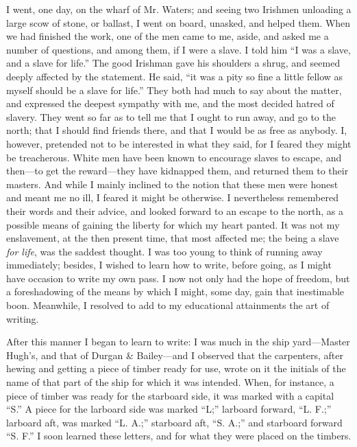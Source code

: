 I went, one day, on the wharf of Mr. Waters; and seeing two Irishmen
unloading a large scow of stone, or ballast, I went on board, unasked,
and helped them. When we had finished the work, one of the men came to
me, aside, and asked me a number of questions, and among them, if I were
a slave. I told him {}``I was a slave, and a slave for life.'' The good
Irishman gave his shoulders a shrug, and seemed deeply affected by the
statement. He said, ``it was a pity so fine a little fellow as myself
should be a slave for life.'' They both had much to say about the
matter, and expressed the deepest sympathy with me, and the most decided
hatred of slavery. They went so far as to tell me that I ought to run
away, and go to the north; that I should find friends there, and that I
would be as free as anybody. I, however, pretended not to be interested
in what they said, for I feared they might be treacherous. White men
have been known to encourage slaves to escape, and then---to get the
reward---they have kidnapped them, and returned them to their masters.
And while I mainly inclined to the notion that these men were honest and
meant me no ill, I feared it might be otherwise. I nevertheless
remembered their words and their advice, and looked forward to an escape
to the north, as a possible means of gaining the liberty for which my
heart panted. It was not my enslavement, at the then present time, that
most affected me; the being a slave \emph{for life}, was the saddest
thought. I was too young to think of running away immediately; besides,
I wished to learn how to write, before going, as I might have occasion
to write my own pass. I now not only had the hope of freedom, but a
foreshadowing of the means by which I might, some day, gain that
inestimable boon. Meanwhile, I resolved to add to my educational
attainments the art of writing.

After this manner I began to learn to write: I was much in the ship
yard---Master Hugh's, and that of {}Durgan \& Bailey---and I observed
that the carpenters, after hewing and getting a piece of timber ready
for use, wrote on it the initials of the name of that part of the ship
for which it was intended. When, for instance, a piece of timber was
ready for the starboard side, it was marked with a capital ``S.'' A
piece for the larboard side was marked ``L;'' larboard forward, ``L.
F.;'' larboard aft, was marked ``L. A.;'' starboard aft, ``S. A.;'' and
starboard forward ``S. F.'' I soon learned these letters, and for what
they were placed on the timbers.

